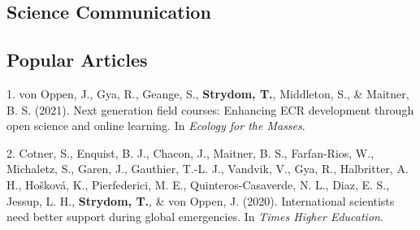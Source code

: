 \documentclass[11pt,a4paper,]{awesome-cv}
\newlength{\cslhangindent}
\newenvironment{CSLReferences}[2] %
 {\begin{list}{}{%
  \setlength{\itemindent}{0pt}
  \setlength{\leftmargin}{0pt}
  \setlength{\parsep}{0pt}
  \ifodd #1
   \setlength{\leftmargin}{\cslhangindent}
   \setlength{\itemindent}{-1\cslhangindent}
  \fi
  \setlength{\itemsep}{#2\baselineskip}}}
 {\end{list}}
\begin{document}
\vspace{\baselineskip}

\subsection{\texorpdfstring{\textbf{Science
Communication}}{Science Communication}}\label{science-communication}

\begin{cventries}
    \vspace{-4.0mm}
\end{cventries}
\vspace{\baselineskip}

\subsection{\texorpdfstring{\textbf{Popular
Articles}}{Popular Articles}}\label{popular-articles}

\label{refs-83b26223daf8352e213dd849388eea17}
\begin{CSLReferences}{1}{0}
1. von Oppen, J., Gya, R., Geange, S., \textbf{Strydom, T.}, Middleton,
S., \& Maitner, B. S. (2021). Next generation field courses: Enhancing
ECR development through open science and online learning. In
\emph{Ecology for the Masses}.

2. Cotner, S., Enquist, B. J., Chacon, J., Maitner, B. S., Farfan-Rios,
W., Michaletz, S., Garen, J., Gauthier, T.-L. J., Vandvik, V., Gya, R.,
Halbritter, A. H., Hošková, K., Pierfederici, M. E.,
Quinteros-Casaverde, N. L., Diaz, E. S., Jessup, L. H.,
\textbf{Strydom, T.}, \& von Oppen, J. (2020). International scientists
need better support during global emergencies. In \emph{Times Higher
Education}.

\end{CSLReferences}
\end{document}
